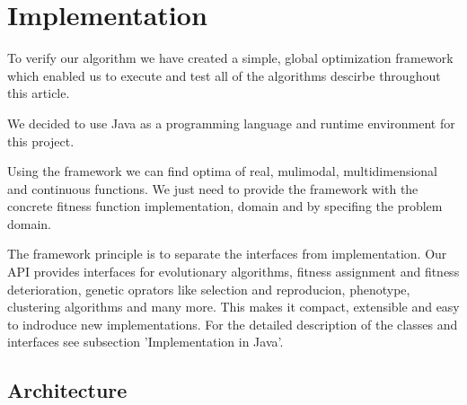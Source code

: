 

\chapter{Implementation}
\label{Implementation}
To verify our algorithm we have created a simple, global optimization framework
which enabled us to execute and test all of the algorithms descirbe throughout
this article.

We decided to use Java \cite{java} as a programming language and runtime
environment for this project. 

Using the framework we can find optima of real, mulimodal, multidimensional and
continuous functions. We just need to provide the framework with the concrete
fitness function implementation, domain and by specifing the problem domain.

The framework principle is to separate the interfaces from implementation.
Our API provides interfaces for evolutionary algorithms, fitness assignment
and fitness deterioration, genetic oprators like selection and reproducion,
phenotype, clustering algorithms and many more. This makes it compact,
extensible and easy to indroduce new implementations.
For the detailed description of the classes and interfaces see subsection
'Implementation in Java'.  

\section{Architecture}


